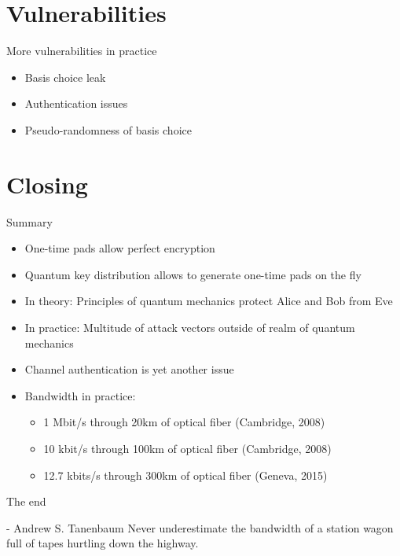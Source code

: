 \documentclass{beamer}
\begin{document}
	\section{Vulnerabilities}

	\begin{frame}{More vulnerabilities in practice} %
		\begin{itemize}
			\item Basis choice leak							
			\item Authentication issues
			\item Pseudo-randomness of basis choice
		\end{itemize}
	\end{frame}

	\section{Closing}


	\begin{frame}{Summary} %
		\begin{itemize}
			\item<1-> One-time pads allow perfect encryption
			\item<2-> Quantum key distribution allows to generate one-time pads on the fly
			\item<3-> In theory: Principles of quantum mechanics protect Alice and Bob from Eve
			\item<4-> In practice: Multitude of attack vectors outside of realm of quantum mechanics
			\item<5-> Channel authentication is yet another issue
			\item<6-> Bandwidth in practice:
				\begin{itemize}
					\item 1 Mbit/s through 20km of optical fiber (Cambridge, 2008)
					\item 10 kbit/s through 100km of optical fiber (Cambridge, 2008)
					\item 12.7 kbits/s through 300km of optical fiber (Geneva, 2015)
				\end{itemize}
		\end{itemize}
	\end{frame}

	\begin{frame}{The end}
		\begin{shadequote}{- Andrew S. Tanenbaum}
			Never underestimate the bandwidth of a station wagon full of tapes hurtling down the highway.
		\end{shadequote}



	\end{frame}
\end{document}
